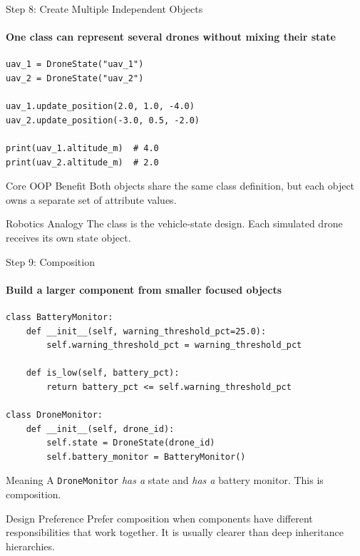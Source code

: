 \begin{frame}[fragile]{Step 8: Create Multiple Independent Objects}
\framesubtitle{One class can represent several drones without mixing their state}

\begin{verbatim}
uav_1 = DroneState("uav_1")
uav_2 = DroneState("uav_2")

uav_1.update_position(2.0, 1.0, -4.0)
uav_2.update_position(-3.0, 0.5, -2.0)

print(uav_1.altitude_m)  # 4.0
print(uav_2.altitude_m)  # 2.0
\end{verbatim}

\begin{block}{Core OOP Benefit}
    Both objects share the same class definition, but each object owns a separate
    set of attribute values.
\end{block}

\begin{exampleblock}{Robotics Analogy}
    The class is the vehicle-state design. Each simulated drone receives its own
    state object.
\end{exampleblock}
\end{frame}


\begin{frame}[fragile]{Step 9: Composition}
\framesubtitle{Build a larger component from smaller focused objects}

\begin{verbatim}
class BatteryMonitor:
    def __init__(self, warning_threshold_pct=25.0):
        self.warning_threshold_pct = warning_threshold_pct

    def is_low(self, battery_pct):
        return battery_pct <= self.warning_threshold_pct

class DroneMonitor:
    def __init__(self, drone_id):
        self.state = DroneState(drone_id)
        self.battery_monitor = BatteryMonitor()
\end{verbatim}

\begin{block}{Meaning}
    A \texttt{DroneMonitor} \textit{has a} state and \textit{has a} battery monitor.
    This is composition.
\end{block}

\begin{exampleblock}{Design Preference}
    Prefer composition when components have different responsibilities that work
    together. It is usually clearer than deep inheritance hierarchies.
\end{exampleblock}
\end{frame}


